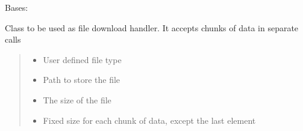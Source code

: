 \documentclass[letterpaper,10pt,english]{sphinxmanual}
\begin{document}
\begin{savenotes}\begin{fulllineitems}
\label{\detokenize{eezz:eezz.filesrv.TFile}}
\pysigstartsignatures
{}
\pysigstopsignatures
\sphinxAtStartPar
Bases: 

\sphinxAtStartPar
Class to be used as file download handler. It accepts chunks of data in separate calls
\begin{quote}\begin{description}
\begin{itemize}
\item {} 
\sphinxAtStartPar
{} \textendash{} User defined file type

\item {} 
\sphinxAtStartPar
{} \textendash{} Path to store the file

\item {} 
\sphinxAtStartPar
{} \textendash{} The size of the file

\item {} 
\sphinxAtStartPar
{} \textendash{} Fixed size for each chunk of data, except the last element

\end{itemize}

\end{description}\end{quote}


\end{fulllineitems}
\end{savenotes}
\end{document}
